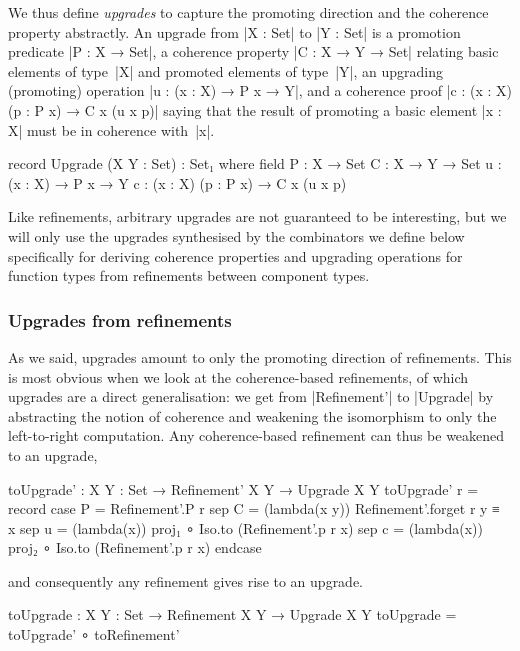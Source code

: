 We thus define \emph{upgrades} to capture the promoting direction and the coherence property abstractly.
An upgrade from |X : Set| to |Y : Set| is a promotion predicate |P : X → Set|, a coherence property |C : X → Y → Set| relating basic elements of type~|X| and promoted elements of type~|Y|, an upgrading (promoting) operation |u : (x : X) → P x → Y|, and a coherence proof |c : (x : X) (p : P x) → C x (u x p)| saying that the result of promoting a basic element |x : X| must be in coherence with~|x|.
\begin{code}
record Upgrade (X Y : Set) : Set₁ where
  field
    P  :  X → Set
    C  :  X → Y → Set
    u  :  (x : X) → P x → Y
    c  :  (x : X) (p : P x) → C x (u x p)
\end{code}
Like refinements, arbitrary upgrades are not guaranteed to be interesting, but we will only use the upgrades synthesised by the combinators we define below specifically for deriving coherence properties and upgrading operations for function types from refinements between component types.

\subsubsection{Upgrades from refinements}

As we said, upgrades amount to only the promoting direction of refinements.
This is most obvious when we look at the coherence-based refinements, of which upgrades are a direct generalisation: we get from |Refinement'| to |Upgrade| by abstracting the notion of coherence and weakening the isomorphism to only the left-to-right computation.
Any coherence-based refinement can thus be weakened to an upgrade,
\begin{code}
toUpgrade' : {X Y : Set} → Refinement' X Y → Upgrade X Y
toUpgrade' r = record  case  P  =  Refinement'.P r
                       sep   C  =  (lambda(x y)) Refinement'.forget r y ≡ x
                       sep   u  =  (lambda(x)) proj₁  ∘ Iso.to (Refinement'.p r x)
                       sep   c  =  (lambda(x)) proj₂  ∘ Iso.to (Refinement'.p r x) endcase
\end{code}
and consequently any refinement gives rise to an upgrade.
\begin{code}
toUpgrade : {X Y : Set} → Refinement X Y → Upgrade X Y
toUpgrade = toUpgrade' ∘ toRefinement'
\end{code}

